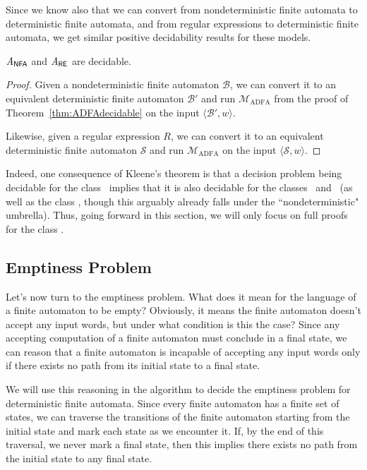 Since we know also that we can convert from nondeterministic finite automata to deterministic finite automata, and from regular expressions to deterministic finite automata, we get similar positive decidability results for these models.

\begin{corollary}
$\mathit{A}_{\textsf{NFA}}$ and $\mathit{A}_{\textsf{RE}}$ are decidable.

\begin{proof}
Given a nondeterministic finite automaton $\mathcal{B}$, we can convert it to an equivalent deterministic finite automaton $\mathcal{B}'$ and run $\mathcal{M}_{\mathrm{ADFA}}$ from the proof of Theorem~\ref{thm:ADFAdecidable} on the input $\langle \mathcal{B}', w \rangle$.

Likewise, given a regular expression $R$, we can convert it to an equivalent deterministic finite automaton $\mathcal{S}$ and run $\mathcal{M}_{\mathrm{ADFA}}$ on the input $\langle \mathcal{S}, w \rangle$.
\end{proof}
\end{corollary}

Indeed, one consequence of Kleene's theorem is that a decision problem being decidable for the class \DFA\ implies that it is also decidable for the classes \NFA\ and \RE\ (as well as the class \ENFA, though this arguably already falls under the ``nondeterministic" umbrella). Thus, going forward in this section, we will only focus on full proofs for the class \DFA.

\subsection*{Emptiness Problem}

Let's now turn to the emptiness problem. What does it mean for the language of a finite automaton to be empty? Obviously, it means the finite automaton doesn't accept any input words, but under what condition is this the case? Since any accepting computation of a finite automaton must conclude in a final state, we can reason that a finite automaton is incapable of accepting any input words only if there exists no path from its initial state to a final state.

We will use this reasoning in the algorithm to decide the emptiness problem for deterministic finite automata. Since every finite automaton has a finite set of states, we can traverse the transitions of the finite automaton starting from the initial state and mark each state as we encounter it. If, by the end of this traversal, we never mark a final state, then this implies there exists no path from the initial state to any final state.

